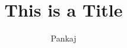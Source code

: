 \documentclass{pkStudyNotes}
\begin{document}
    \title{This is a Title}
    \author{Pankaj}
    \maketitle
    \newpage
    \lipsum[1]
    
\end{document}
